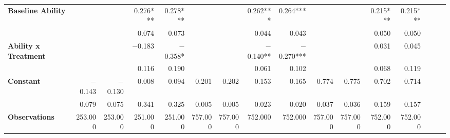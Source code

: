 \begin{tabular}{@{\extracolsep{5pt}}lrrrrrrrrrrrrrrr}
{\bf Baseline Ability} & \phantom{***} & \phantom{***} & 0.276\phantom{)}*** & 0.278\phantom{)}*** & \phantom{***} & \phantom{***} & 0.262\phantom{)}*** & 0.264\phantom{)}*** & \phantom{***} & \phantom{***} & 0.215\phantom{)}*** & 0.215\phantom{)}*** \\
{\bf } & \phantom{***} & \phantom{***} & 0.074\phantom{\phantom{)}***} & 0.073\phantom{\phantom{)}***} & \phantom{***} & \phantom{***} & 0.044\phantom{\phantom{)}***} & 0.043\phantom{\phantom{)}***} & \phantom{***} & \phantom{***} & 0.050\phantom{\phantom{)}***} & 0.050\phantom{\phantom{)}***} \\
{\bf Ability x Treatment} & \phantom{***} & \phantom{***} & $-$0.183\phantom{\phantom{)}***} & $-$0.358\phantom{)}*\phantom{**} & \phantom{***} & \phantom{***} & $-$0.140\phantom{)}**\phantom{*} & $-$0.270\phantom{)}*** & \phantom{***} & \phantom{***} & 0.031\phantom{\phantom{)}***} & 0.045\phantom{\phantom{)}***} \\
{\bf } & \phantom{***} & \phantom{***} & 0.116\phantom{\phantom{)}***} & 0.190\phantom{\phantom{)}***} & \phantom{***} & \phantom{***} & 0.061\phantom{\phantom{)}***} & 0.102\phantom{\phantom{)}***} & \phantom{***} & \phantom{***} & 0.068\phantom{\phantom{)}***} & 0.119\phantom{\phantom{)}***} \\
{\bf Constant} & $-$0.143\phantom{\phantom{)}***} & $-$0.130\phantom{\phantom{)}***} & 0.008\phantom{\phantom{)}***} & 0.094\phantom{\phantom{)}***} & 0.201\phantom{\phantom{)}***} & 0.202\phantom{\phantom{)}***} & 0.153\phantom{\phantom{)}***} & 0.165\phantom{\phantom{)}***} & 0.774\phantom{\phantom{)}***} & 0.775\phantom{\phantom{)}***} & 0.702\phantom{\phantom{)}***} & 0.714\phantom{\phantom{)}***} \\
{\bf } & 0.079\phantom{\phantom{)}***} & 0.075\phantom{\phantom{)}***} & 0.341\phantom{\phantom{)}***} & 0.325\phantom{\phantom{)}***} & 0.005\phantom{\phantom{)}***} & 0.005\phantom{\phantom{)}***} & 0.023\phantom{\phantom{)}***} & 0.020\phantom{\phantom{)}***} & 0.037\phantom{\phantom{)}***} & 0.036\phantom{\phantom{)}***} & 0.159\phantom{\phantom{)}***} & 0.157\phantom{\phantom{)}***} \\
{\bf Observations} & 253.000\phantom{\phantom{)}***} & 253.000\phantom{\phantom{)}***} & 251.000\phantom{\phantom{)}***} & 251.000\phantom{\phantom{)}***} & 757.000\phantom{\phantom{)}***} & 757.000\phantom{\phantom{)}***} & 752.000\phantom{\phantom{)}***} & 752.000\phantom{\phantom{)}***} & 757.000\phantom{\phantom{)}***} & 757.000\phantom{\phantom{)}***} & 752.000\phantom{\phantom{)}***} & 752.000\phantom{\phantom{)}***} \\

\end{tabular}
